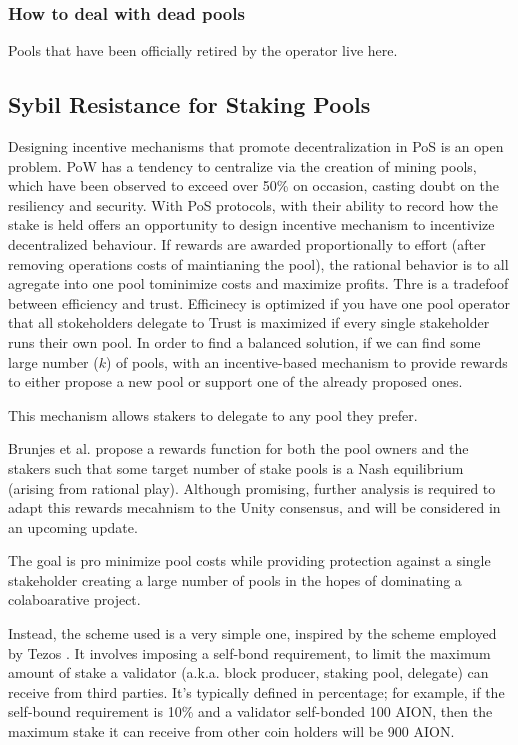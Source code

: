 \subsubsection{How to deal with dead pools}
Pools that have been officially retired by the operator live here. 

\subsection{Sybil Resistance for Staking Pools}
Designing incentive mechanisms that promote decentralization in PoS is an open problem. PoW has a tendency to centralize via the creation of mining pools, which have been observed to exceed over 50\% on occasion, casting doubt on the resiliency and security.
With PoS protocols, with their ability to record how the stake is held offers an opportunity to design incentive mechanism to incentivize decentralized behaviour. 
If rewards are awarded proportionally to effort (after removing operations costs of maintianing the pool), the rational behavior is to all agregate into one pool tominimize costs and maximize profits. 
Thre is a tradefoof between efficiency and trust. 
Efficinecy is optimized if you have one pool operator that all stokeholders delegate to
Trust is maximized if every single stakeholder runs their own pool. 
In order to find a balanced solution, if we can find some large number ($k$) of pools, with an incentive-based mechanism to provide rewards to either propose a new pool or support one of the already proposed ones. 

This mechanism allows stakers to delegate to any pool they prefer. 

Brunjes et al. propose a rewards function for both the pool owners and the stakers such that some target number of stake pools is a Nash equilibrium (arising from rational play). Although promising, further analysis is required to adapt this rewards mecahnism to the Unity consensus, and will be considered in an upcoming update. 

The goal is pro minimize pool costs while providing protection against a single stakeholder creating a large number of pools in the hopes of dominating a colaboarative project. 

Instead, the scheme used is a very simple one, inspired by the scheme employed by Tezos \cite{Goo14}. It involves imposing a self-bond requirement, to limit the maximum amount of stake a validator (a.k.a. block producer, staking pool, delegate) can receive from third parties. It's typically defined in percentage; for example, if the self-bound requirement is 10\% and a validator self-bonded 100 AION, then the maximum stake it can receive from other coin holders will be 900 AION.

